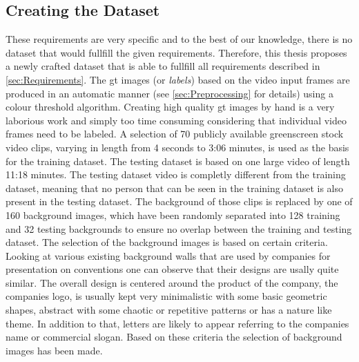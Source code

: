 \documentclass[11pt,
  paper=a4, 
  bibliography=totocnumbered,
	captions=tableheading,
	BCOR=10mm
]{scrreprt}
\theoremstyle{definition}
\begin{document}
\subsection{Creating the Dataset}
These requirements are very specific and to the best of our knowledge, there is no dataset that would fullfill the given requirements.
Therefore, this thesis proposes a newly crafted dataset that is able to fullfill all requirements described in \ref{sec:Requirements}.
The \gls{gt} images (or \textit{labels}) based on the video input frames are produced in an automatic manner (see \ref{sec:Preprocessing} for details) using a colour threshold algorithm.
Creating high quality \gls{gt} images by hand is a very laborious work and simply too time consuming considering that individual video frames need to be labeled.
A selection of 70 publicly available greenscreen stock video clips, varying in length from 4 seconds to 3:06 minutes, is used as the basis for the training dataset.
The testing dataset is based on one large video of length 11:18 minutes.
The testing dataset video is completly different from the training dataset, meaning that no person that can be seen in the training dataset is also present in the testing dataset.
The background of those clips is replaced by one of 160 background images, which have been randomly separated into 128 training and 32 testing backgrounds to ensure no overlap between the training and testing dataset.
The selection of the background images is based on certain criteria.
Looking at various existing background walls that are used by companies for presentation on conventions one can observe that their designs are usally quite similar.
The overall design is centered around the product of the company, the companies logo, is usually kept very minimalistic with some basic geometric shapes, abstract with some chaotic or repetitive patterns or has a nature like theme.
In addition to that, letters are likely to appear referring to the companies name or commercial slogan.
Based on these criteria the selection of background images has been made.
\end{document}
